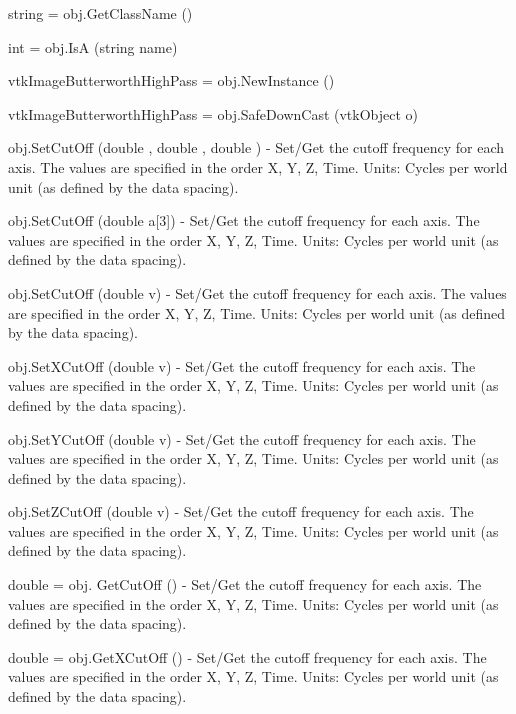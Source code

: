 \begin{DoxyItemize}
\item {\ttfamily string = obj.\-Get\-Class\-Name ()}  
\item {\ttfamily int = obj.\-Is\-A (string name)}  
\item {\ttfamily vtk\-Image\-Butterworth\-High\-Pass = obj.\-New\-Instance ()}  
\item {\ttfamily vtk\-Image\-Butterworth\-High\-Pass = obj.\-Safe\-Down\-Cast (vtk\-Object o)}  
\item {\ttfamily obj.\-Set\-Cut\-Off (double , double , double )} -\/ Set/\-Get the cutoff frequency for each axis. The values are specified in the order X, Y, Z, Time. Units\-: Cycles per world unit (as defined by the data spacing).  
\item {\ttfamily obj.\-Set\-Cut\-Off (double a\mbox{[}3\mbox{]})} -\/ Set/\-Get the cutoff frequency for each axis. The values are specified in the order X, Y, Z, Time. Units\-: Cycles per world unit (as defined by the data spacing).  
\item {\ttfamily obj.\-Set\-Cut\-Off (double v)} -\/ Set/\-Get the cutoff frequency for each axis. The values are specified in the order X, Y, Z, Time. Units\-: Cycles per world unit (as defined by the data spacing).  
\item {\ttfamily obj.\-Set\-X\-Cut\-Off (double v)} -\/ Set/\-Get the cutoff frequency for each axis. The values are specified in the order X, Y, Z, Time. Units\-: Cycles per world unit (as defined by the data spacing).  
\item {\ttfamily obj.\-Set\-Y\-Cut\-Off (double v)} -\/ Set/\-Get the cutoff frequency for each axis. The values are specified in the order X, Y, Z, Time. Units\-: Cycles per world unit (as defined by the data spacing).  
\item {\ttfamily obj.\-Set\-Z\-Cut\-Off (double v)} -\/ Set/\-Get the cutoff frequency for each axis. The values are specified in the order X, Y, Z, Time. Units\-: Cycles per world unit (as defined by the data spacing).  
\item {\ttfamily double = obj. Get\-Cut\-Off ()} -\/ Set/\-Get the cutoff frequency for each axis. The values are specified in the order X, Y, Z, Time. Units\-: Cycles per world unit (as defined by the data spacing).  
\item {\ttfamily double = obj.\-Get\-X\-Cut\-Off ()} -\/ Set/\-Get the cutoff frequency for each axis. The values are specified in the order X, Y, Z, Time. Units\-: Cycles per world unit (as defined by the data spacing).  

\end{DoxyItemize}
